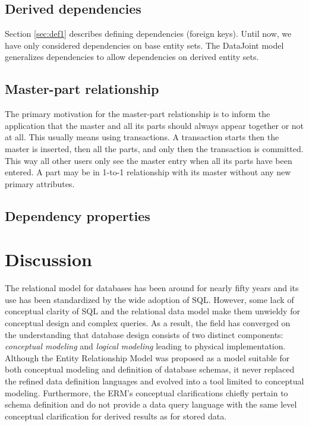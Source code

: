 \documentclass[letter,10pt]{article}
\newcommand{\datajoint}{DataJoint\xspace}
\begin{document}
\subsection{Derived dependencies}\label{sec:dep}
Section \ref{sec:def1} describes defining dependencies (foreign keys).
Until now, we have only considered dependencies on base entity sets. 
The \datajoint model generalizes dependencies to allow dependencies on derived entity sets.

\subsection{Master-part relationship}
The primary motivation for the master-part relationship is to inform the application that the master and all its parts should always appear together or not at all.  
This usually means using transactions.  
A transaction starts then the master is inserted, then all the parts, and only then the transaction is committed.  
This way all other users only see the master entry when all its parts have been entered.
A part may be in 1-to-1 relationship with its master without any new primary attributes.

\subsection{Dependency properties}

\section{Discussion}
The relational model for databases has been around for nearly fifty years and its use has been standardized by the wide adoption of SQL.
However, some lack of conceptual clarity of SQL and the relational data model make them unwieldy for conceptual design and complex queries.
As a result, the field has converged on the understanding that database design consists of two distinct components: \emph{conceptual modeling} and \emph{logical modeling} leading to physical implementation. 
Although the Entity Relationship Model was proposed as a model suitable for both conceptual modeling and definition of database schemas, it never replaced the refined data definition languages and evolved into a tool limited to conceptual modeling.  
Furthermore, the ERM's conceptual clarifications chiefly pertain to schema definition and do not provide a data query language with the same level conceptual clarification for derived results as for stored data.
\end{document}
